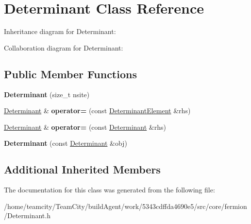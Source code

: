 \hypertarget{classDeterminant}{}\section{Determinant Class Reference}
\label{classDeterminant}


Inheritance diagram for Determinant\+:


Collaboration diagram for Determinant\+:
\subsection*{Public Member Functions}
\begin{DoxyCompactItemize}
\item 
{\bfseries Determinant} (size\+\_\+t nsite)\hypertarget{classDeterminant_ab4bc213a4be8141ad78a5b89e55f6365}{}\label{classDeterminant_ab4bc213a4be8141ad78a5b89e55f6365}

\item 
\hyperlink{classDeterminant}{Determinant} \& {\bfseries operator=} (const \hyperlink{classDeterminantElement}{Determinant\+Element} \&rhs)\hypertarget{classDeterminant_a7e7423bd3b83b14a25039b70246f0bb7}{}\label{classDeterminant_a7e7423bd3b83b14a25039b70246f0bb7}

\item 
\hyperlink{classDeterminant}{Determinant} \& {\bfseries operator=} (const \hyperlink{classDeterminant}{Determinant} \&rhs)\hypertarget{classDeterminant_a4c2983ed67891b319c2fd9d7f518b698}{}\label{classDeterminant_a4c2983ed67891b319c2fd9d7f518b698}

\item 
{\bfseries Determinant} (const \hyperlink{classDeterminant}{Determinant} \&obj)\hypertarget{classDeterminant_a67cbe0742c6b5f3a211aff76112de960}{}\label{classDeterminant_a67cbe0742c6b5f3a211aff76112de960}

\end{DoxyCompactItemize}
\subsection*{Additional Inherited Members}


The documentation for this class was generated from the following file\+:\begin{DoxyCompactItemize}
\item 
/home/teamcity/\+Team\+City/build\+Agent/work/5343cdffda4690e5/src/core/fermion/Determinant.\+h\end{DoxyCompactItemize}
